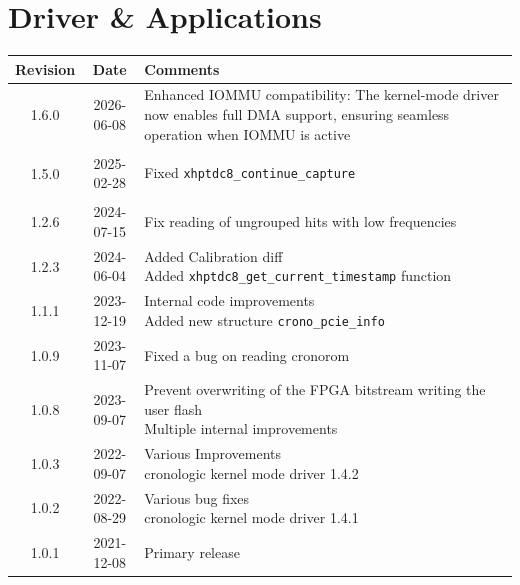 \section{Driver \& Applications} \label{sec:driver}
\begin{tabularx}{\textwidth}{|c|c|X|}
    \hline
    Revision & Date & Comments\\
    \hline\hline

    \hypertarget{drvrev}{1.6.0} & 2026-06-08 &
        Enhanced IOMMU compatibility: The kernel-mode driver now enables full DMA
        support, ensuring seamless operation when IOMMU is active
    \\
    \hline
    \hypertarget{drvrev}{1.5.0} & 2025-02-28 &
    \makecell[l]{
        Fixed \texttt{xhptdc8\_continue\_capture}\\*
    }\\
    \hline
    1.2.6 & 2024-07-15 &
    \makecell[l]{
        Fix reading of ungrouped hits with low frequencies\\*
    }\\
    \hline
    1.2.3 & 2024-06-04 &
    \makecell[l]{
        Added Calibration diff\\*
        Added \texttt{xhptdc8\_get\_current\_timestamp} function\\*
    }\\
    \hline
    1.1.1 & 2023-12-19 &
    \makecell[l]{
        Internal code improvements\\*
        Added new structure \texttt{crono\_pcie\_info}
    }\\
    \hline
    1.0.9 & 2023-11-07 & Fixed a bug on reading cronorom   \\
    \hline
    1.0.8 & 2023-09-07 &
    \makecell[l]{
        Prevent overwriting of the FPGA bitstream writing the user flash\\*
        Multiple internal improvements
    }\\
    \hline
    1.0.3 & 2022-09-07 &
    \makecell[l]{
        Various Improvements\\*
        cronologic kernel mode driver 1.4.2
    }\\
    \hline
    1.0.2 & 2022-08-29 &
    \makecell[l]{
        Various bug fixes\\*
        cronologic kernel mode driver 1.4.1
    }\\
    \hline
    1.0.1 & 2021-12-08 & Primary release\\
    \hline
\end{tabularx}